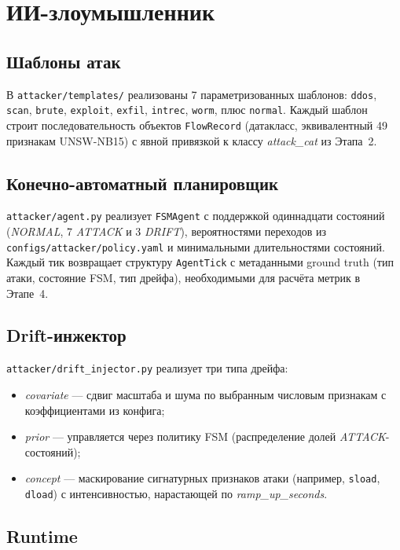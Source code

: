 \documentclass[14pt, a4paper]{extarticle}
\begin{document}
\section{ИИ-злоумышленник}

\subsection{Шаблоны атак}

В \texttt{attacker/templates/} реализованы 7 параметризованных шаблонов:
\texttt{ddos}, \texttt{scan}, \texttt{brute}, \texttt{exploit}, \texttt{exfil},
\texttt{intrec}, \texttt{worm}, плюс \texttt{normal}. Каждый шаблон строит
последовательность объектов \texttt{FlowRecord} (датакласс, эквивалентный
49 признакам UNSW-NB15) с явной привязкой к классу \emph{attack\_cat} из
 Этапа~2.

\subsection{Конечно-автоматный планировщик}

\texttt{attacker/agent.py} реализует \texttt{FSMAgent} с поддержкой
одиннадцати состояний (\emph{NORMAL}, 7 \emph{ATTACK} и 3 \emph{DRIFT}),
вероятностями переходов из \texttt{configs/attacker/policy.yaml} и
минимальными длительностями состояний. Каждый тик возвращает структуру
\texttt{AgentTick} с метаданными ground truth (тип атаки, состояние FSM,
тип дрейфа), необходимыми для расчёта метрик в Этапе~4.

\subsection{Drift-инжектор}

\texttt{attacker/drift\_injector.py} реализует три типа дрейфа:
\begin{itemize}
    \item \emph{covariate} --- сдвиг масштаба и шума по выбранным
    числовым признакам с коэффициентами из конфига;
    \item \emph{prior} --- управляется через политику FSM (распределение
    долей \emph{ATTACK}-состояний);
    \item \emph{concept} --- маскирование сигнатурных признаков атаки
    (например, \texttt{sload}, \texttt{dload}) с интенсивностью,
    нарастающей по \emph{ramp\_up\_seconds}.
\end{itemize}

\subsection{Runtime}
\end{document}
